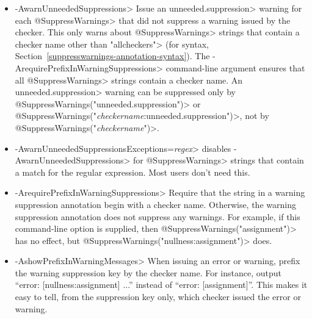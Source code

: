 \begin{itemize}
  With each warning, show all possible strings to suppress that warning.
\item \<-AwarnUnneededSuppressions>
  Issue an \<unneeded.suppression> warning for each \<@SuppressWarnings>
  that did not suppress a warning
  issued by the checker.  This only warns about
  \<@SuppressWarnings> strings that contain a checker name
  other than \<"allcheckers">
  (for syntax, Section~\ref{suppresswarnings-annotation-syntax}).  The
  \<-ArequirePrefixInWarningSuppressions> command-line argument ensures
  that all \<@SuppressWarnings> strings contain a checker name.
  An \<unneeded.suppression> warning can be suppressed only by
  \<@SuppressWarnings("unneeded.suppression")>
  or \<@SuppressWarnings("\emph{checkername}:unneeded.suppression")>,
  not by \<@SuppressWarnings("\emph{checkername}")>.
\item \<-AwarnUnneededSuppressionsExceptions=\emph{regex}> disables
  \<-AwarnUnneededSuppressions> for \<@SuppressWarnings> strings that
  contain a match for the regular expression.  Most users don't need this.
\item \<-ArequirePrefixInWarningSuppressions>
  Require that the string in a warning suppression annotation begin with a checker
  name.  Otherwise, the warning suppression annotation does not
  suppress any warnings.  For example, if this command-line option is
  supplied, then \<@SuppressWarnings("assignment")> has no effect, but
  \<@SuppressWarnings("nullness:assignment")> does.
\item \<-AshowPrefixInWarningMessages>
  When issuing an error or warning, prefix the warning suppression key by
  the checker name.  For instance, output ``error: [nullness:assignment]
  ...'' instead of ``error: [assignment]''.  This makes it easy to tell,
  from the suppression key only, which checker issued the error or warning.
\end{itemize}

